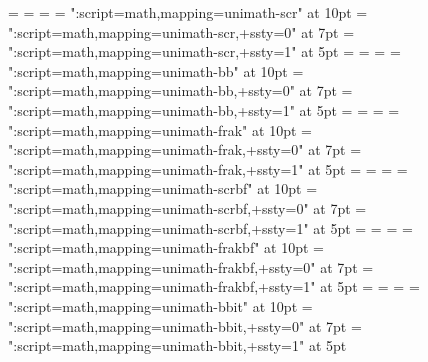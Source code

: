 \newfam\textsfbfitfam
\textfont         \textsfbfitfam =   \tensfbfit
\scriptfont       \textsfbfitfam = \sevensfbfit
\scriptscriptfont \textsfbfitfam =  \fivesfbfit
\def\sfbfit{\fam\textsfbfitfam\tensfbfit}
\newfam\scrfam
\font  \tenscr = "\mathalphafontname:script=math,mapping=unimath-scr" at 10pt
\font\sevenscr = "\mathalphafontname:script=math,mapping=unimath-scr,+ssty=0" at 7pt
\font \fivescr = "\mathalphafontname:script=math,mapping=unimath-scr,+ssty=1" at 5pt
\textfont         \scrfam =   \tenscr
\scriptfont       \scrfam = \sevenscr
\scriptscriptfont \scrfam =  \fivescr
\def\scr{\fam\scrfam}
\newfam\bbfam
\font  \tenbb = "\mathalphafontname:script=math,mapping=unimath-bb" at 10pt
\font\sevenbb = "\mathalphafontname:script=math,mapping=unimath-bb,+ssty=0" at 7pt
\font \fivebb = "\mathalphafontname:script=math,mapping=unimath-bb,+ssty=1" at 5pt
\textfont         \bbfam =   \tenbb
\scriptfont       \bbfam = \sevenbb
\scriptscriptfont \bbfam =  \fivebb
\def\bb{\fam\bbfam}
\newfam\frakfam
\font  \tenfrak = "\mathalphafontname:script=math,mapping=unimath-frak" at 10pt
\font\sevenfrak = "\mathalphafontname:script=math,mapping=unimath-frak,+ssty=0" at 7pt
\font \fivefrak = "\mathalphafontname:script=math,mapping=unimath-frak,+ssty=1" at 5pt
\textfont         \frakfam =   \tenfrak
\scriptfont       \frakfam = \sevenfrak
\scriptscriptfont \frakfam =  \fivefrak
\def\frak{\fam\frakfam}
\newfam\scrbffam
\font  \tenscrbf = "\mathalphafontname:script=math,mapping=unimath-scrbf" at 10pt
\font\sevenscrbf = "\mathalphafontname:script=math,mapping=unimath-scrbf,+ssty=0" at 7pt
\font \fivescrbf = "\mathalphafontname:script=math,mapping=unimath-scrbf,+ssty=1" at 5pt
\textfont         \scrbffam =   \tenscrbf
\scriptfont       \scrbffam = \sevenscrbf
\scriptscriptfont \scrbffam =  \fivescrbf
\def\scrbf{\fam\scrbffam}
\newfam\frakbffam
\font  \tenfrakbf = "\mathalphafontname:script=math,mapping=unimath-frakbf" at 10pt
\font\sevenfrakbf = "\mathalphafontname:script=math,mapping=unimath-frakbf,+ssty=0" at 7pt
\font \fivefrakbf = "\mathalphafontname:script=math,mapping=unimath-frakbf,+ssty=1" at 5pt
\textfont         \frakbffam =   \tenfrakbf
\scriptfont       \frakbffam = \sevenfrakbf
\scriptscriptfont \frakbffam =  \fivefrakbf
\def\frakbf{\fam\frakbffam}
\newfam\bbitfam
\font  \tenbbit = "\mathalphafontname:script=math,mapping=unimath-bbit" at 10pt
\font\sevenbbit = "\mathalphafontname:script=math,mapping=unimath-bbit,+ssty=0" at 7pt
\font \fivebbit = "\mathalphafontname:script=math,mapping=unimath-bbit,+ssty=1" at 5pt
